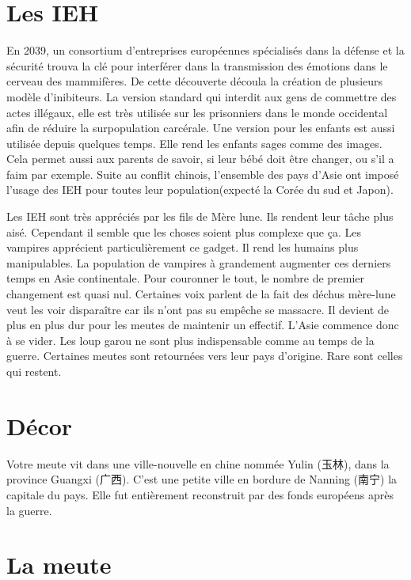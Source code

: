 \documentclass[oneside,12pt]{book}
\begin{document}
\begin{flushleft}
\section{Les IEH}
	En 2039, un consortium d'entreprises européennes spécialisés dans la défense et la sécurité trouva la clé pour interférer dans la transmission des émotions dans le cerveau des mammifères. De cette découverte découla la création de plusieurs modèle d'inibiteurs. La version standard qui interdit aux gens de commettre des actes illégaux, elle est très utilisée sur les prisonniers dans le monde occidental afin de réduire la surpopulation carcérale.  Une version pour les enfants est aussi utilisée depuis quelques temps. Elle rend les enfants sages comme des images. Cela permet aussi aux parents de savoir, si leur bébé doit être changer, ou s'il a faim par exemple.  Suite au conflit  chinois, l'ensemble des pays d'Asie ont imposé l'usage des IEH pour toutes leur population(expecté la Corée du sud et Japon).
	
	Les IEH sont très appréciés par les fils de Mère lune. Ils rendent leur tâche plus aisé.  Cependant il semble que les choses soient plus complexe que ça.  
Les vampires apprécient particulièrement ce gadget. 
Il rend les humains plus manipulables.
La population de vampires à grandement augmenter ces derniers temps en Asie continentale.   
	Pour couronner le tout, le nombre de premier changement est quasi nul. Certaines voix parlent de la fait des déchus mère-lune veut les voir disparaître car ils n'ont pas su empêche se massacre.
Il devient de plus en plus dur pour les meutes de maintenir un effectif. L'Asie commence donc à se vider. Les loup garou ne sont plus indispensable comme au temps de la guerre. Certaines meutes sont retournées vers leur pays d'origine. Rare sont celles qui restent. 
\clearpage
\section{Décor}
	Votre meute vit dans une ville-nouvelle en chine nommée Yulin ({\CH 玉林}), dans la province Guangxi ({\CH 广西}). C'est une petite ville en bordure de Nanning ({\CH 南宁}) la capitale du pays. Elle fut entièrement reconstruit par des fonds européens après la guerre.  
\clearpage
\section{La meute}

\end{flushleft}
\end{document}
